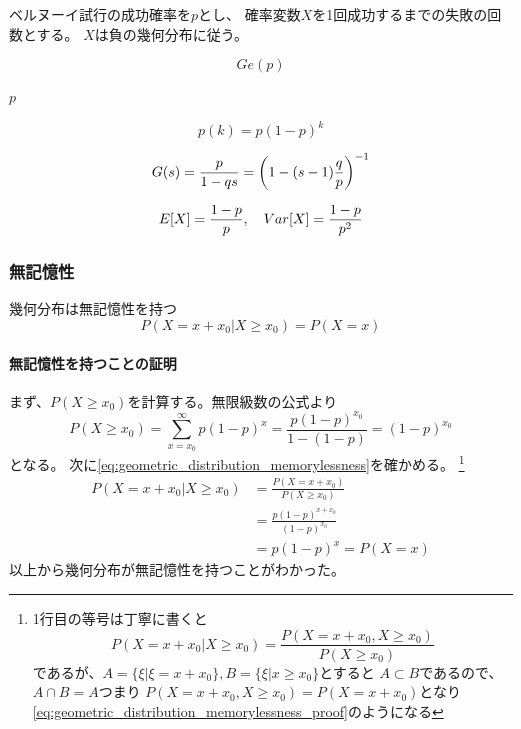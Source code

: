 \begin{outline}[description]
  \1 [意味] ベルヌーイ試行の成功確率を\(p\)とし、
  確率変数\(X\)を1回成功するまでの失敗の回数とする。
  \(X\)は負の幾何分布に従う。
  
  \1 [表記]
  \begin{equation}
    Ge(p)
  \end{equation}
  
  \1 [パラメータ]
  \2
  \2 [成功確率] \(p\)
  
  \1 [確率関数]
  \begin{equation}
    p (k) =  p(1-p)^{k}
  \end{equation}
  
  \1 [確率母関数]
  \begin{equation}
    G (s) = \frac{p}{1 - qs} = \qty ( 1 - (s - 1) \frac{q}{p})^{-1}
  \end{equation}
  
  \1 [期待値・分散]
  \begin{equation}
    E \qty [ X] = \frac{1 - p}{p}, \quad Var \qty [ X ] = \frac{1 - p}{p^2}
  \end{equation}
  
\end{outline}

\subsubsection{無記憶性}

幾何分布は無記憶性を持つ
\begin{equation} \label{eq:geometric_distribution_memorylessness}
  P(X = x + x_0 | X \geq x_0) = P(X = x)
\end{equation}

\paragraph{無記憶性を持つことの証明}
まず、\(P(X \geq x_0)\)を計算する。無限級数の公式より
\begin{equation}
  P(X \geq x_0) = \sum_{x = x_0}^{\infty} p(1-p)^{x}
  = \frac{p(1 - p)^{x_0}}{1 - (1 - p)} = (1 - p)^{x_0}
\end{equation}
となる。
次に\cref{eq:geometric_distribution_memorylessness}を確かめる。
\footnote{1行目の等号は丁寧に書くと
\[  P(X = x + x_0 | X \geq x_0) 
= \frac{P(X = x + x_0, X \geq x_0)}{P(X \geq x_0)} \]
であるが、\(A = \{\xi | \xi = x + x_0\}, B = \{\xi | x \geq x_0\}\)とすると
\(A \subset B\)であるので、\(A \cap B = A\)つまり
\(P(X = x + x_0, X \geq x_0) = P(X = x + x_0)\)となり
\cref{eq:geometric_distribution_memorylessness_proof}のようになる}
\begin{equation} \label{eq:geometric_distribution_memorylessness_proof}
  \begin{aligned}
    P(X = x + x_0 | X \geq x_0) &= \frac{P(X = x + x_0)}{P(X \geq x_0)}  \\
    &= \frac{p(1-p)^{x + x_0}}{(1-p)^{x_0}} \\
    &= p(1-p)^{x} = P(X = x)
  \end{aligned}
\end{equation}
以上から幾何分布が無記憶性を持つことがわかった。


